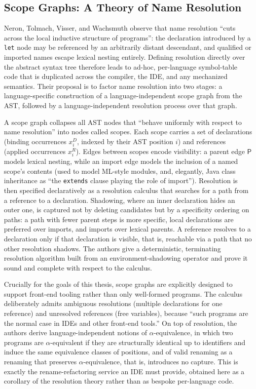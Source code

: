 \subsection{Scope Graphs: A Theory of Name Resolution}
\label{subsec:scope-graphs}

Neron, Tolmach, Visser, and Wachsmuth \cite{scopeGraphs2015} observe that name resolution ``cuts across the local inductive structure of programs'': the declaration introduced by a \texttt{let} node may be referenced by an arbitrarily distant descendant, and qualified or imported names escape lexical nesting entirely. 
Defining resolution directly over the abstract syntax tree therefore leads to ad-hoc, per-language symbol-table code that is duplicated across the compiler, the IDE, and any mechanized semantics. 
Their proposal is to factor name resolution into two stages: a language-specific construction of a language-independent scope graph from the AST, followed by a language-independent resolution process over that graph.

A scope graph collapses all AST nodes that ``behave uniformly with respect to name resolution'' into nodes called scopes. 
Each scope carries a set of declarations (binding occurrences $x^D_i$, indexed by their AST position $i$) and references (applied occurrences $x^R_i$). 
Edges between scopes encode visibility: a parent edge $\mathsf{P}$ models lexical nesting, while an import edge models the inclusion of a named scope's contents (used to model ML-style modules, and, elegantly, Java class inheritance as ``the \texttt{extends} clause playing the role of import'').
Resolution is then specified declaratively as a resolution calculus that searches for a path from a reference to a declaration. 
Shadowing, where an inner declaration hides an outer one, is captured not by deleting candidates but by a specificity ordering on paths: a path with fewer parent steps is more specific, local declarations are preferred over imports, and imports over lexical parents. 
A reference resolves to a declaration only if that declaration is visible, that is, reachable via a path that no other resolution shadows. 
The authors give a deterministic, terminating resolution algorithm built from an environment-shadowing operator and prove it sound and complete with respect to the calculus.

Crucially for the goals of this thesis, scope graphs are explicitly designed to support front-end tooling rather than only well-formed programs. 
The calculus deliberately admits ambiguous resolutions (multiple declarations for one reference) and unresolved references (free variables), because ``such programs are the normal case in IDEs and other front-end tools.''
On top of resolution, the authors derive language-independent notions of $\alpha$-equivalence, in which two programs are $\alpha$-equivalent if they are structurally identical up to identifiers and induce the same equivalence classes of positions, and of valid renaming as a renaming that preserves $\alpha$-equivalence, that is, introduces no capture. 
This is exactly the rename-refactoring service an IDE must provide, obtained here as a corollary of the resolution theory rather than as bespoke per-language code.

